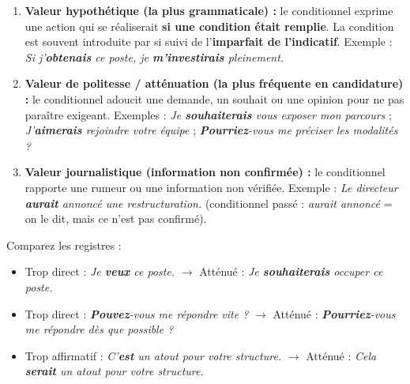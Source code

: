 \documentclass[11pt]{article}
\begin{document}
\begin{propriete}
\begin{enumerate}
    \item \textbf{Valeur hypothétique (la plus grammaticale) :} le conditionnel exprime une action qui se réaliserait \textbf{si une condition était remplie}. La condition est souvent introduite par \og si \fg{} suivi de l'\textbf{imparfait de l'indicatif}. Exemple : \og \emph{Si j'\textbf{obtenais} ce poste, je \textbf{m'investirais} pleinement.} \fg{}
    \item \textbf{Valeur de politesse / atténuation (la plus fréquente en candidature) :} le conditionnel adoucit une demande, un souhait ou une opinion pour ne pas paraître exigeant. Exemples : \og \emph{Je \textbf{souhaiterais} vous exposer mon parcours} \fg{} ; \og \emph{J'\textbf{aimerais} rejoindre votre équipe} \fg{} ; \og \emph{\textbf{Pourriez}-vous me préciser les modalités ?} \fg{}
    \item \textbf{Valeur journalistique (information non confirmée) :} le conditionnel rapporte une rumeur ou une information non vérifiée. Exemple : \og \emph{Le directeur \textbf{aurait} annoncé une restructuration.} \fg{} (conditionnel passé : \emph{aurait annoncé} = on le dit, mais ce n'est pas confirmé).
\end{enumerate}
\end{propriete}

\begin{exemplebox}
Comparez les registres :
\begin{itemize}
    \item Trop direct : \og \emph{Je \textbf{veux} ce poste.} \fg{} $\rightarrow$ Atténué : \og \emph{Je \textbf{souhaiterais} occuper ce poste.} \fg{}
    \item Trop direct : \og \emph{\textbf{Pouvez}-vous me répondre vite ?} \fg{} $\rightarrow$ Atténué : \og \emph{\textbf{Pourriez}-vous me répondre dès que possible ?} \fg{}
    \item Trop affirmatif : \og \emph{C'\textbf{est} un atout pour votre structure.} \fg{} $\rightarrow$ Atténué : \og \emph{Cela \textbf{serait} un atout pour votre structure.} \fg{}
\end{itemize}
\end{exemplebox}
\end{document}
